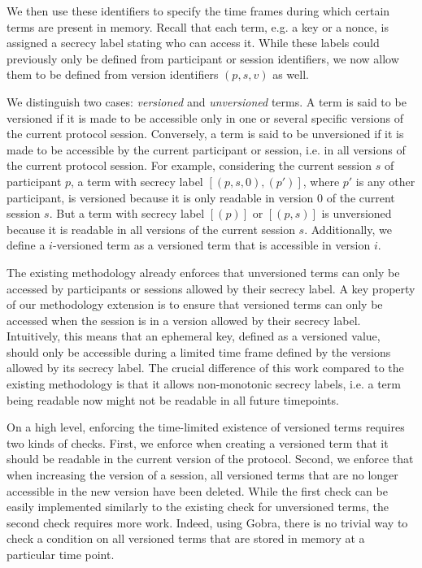 We then use these identifiers to specify the time frames during which certain terms are present in memory.
Recall that each term, e.g. a key or a nonce, is assigned a secrecy label stating who can access it. While these labels could previously only be defined from participant or session identifiers, we now allow them to be defined from version identifiers $(p, s, v)$ as well.

We distinguish two cases: \emph{versioned} and \emph{unversioned} terms.
A term is said to be versioned if it is made to be accessible only in one or several specific versions of the current protocol session.
Conversely, a term is said to be unversioned if it is made to be accessible by the current participant or session, i.e. in all versions of the current protocol session.
For example, considering the current session $s$ of participant $p$, a term with secrecy label $[(p, s, 0), (p')]$, where $p'$ is any other participant, is versioned because it is only readable in version $0$ of the current session $s$. But a term with secrecy label $[(p)]$ or $[(p, s)]$ is unversioned because it is readable in all versions of the current session $s$.
Additionally, we define a $i$-versioned term as a versioned term that is accessible in version $i$.

The existing methodology already enforces that unversioned terms can only be accessed by participants or sessions allowed by their secrecy label.
A key property of our methodology extension is to ensure that versioned terms can only be accessed when the session is in a version allowed by their secrecy label. Intuitively, this means that an ephemeral key, defined as a versioned value, should only be accessible during a limited time frame defined by the versions allowed by its secrecy label.
The crucial difference of this work compared to the existing methodology is that it allows non-monotonic secrecy labels, i.e. a term being readable now might not be readable in all future timepoints.

On a high level, enforcing the time-limited existence of versioned terms requires two kinds of checks.
First, we enforce when creating a versioned term that it should be readable in the current version of the protocol.
Second, we enforce that when increasing the version of a session, all versioned terms that are no longer accessible in the new version have been deleted.
While the first check can be easily implemented similarly to the existing check for unversioned terms, the second check requires more work. Indeed, using Gobra, there is no trivial way to check a condition on all versioned terms that are stored in memory at a particular time point.

